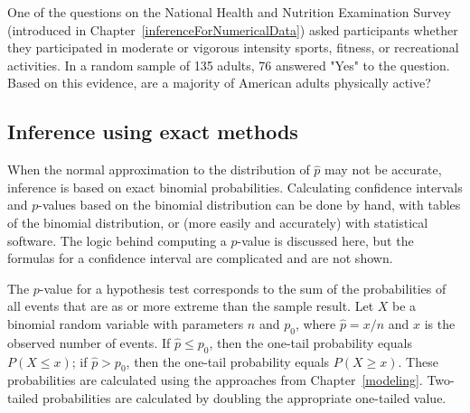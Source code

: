 
\textD{\newpage}

\begin{exercisewrap}
\begin{nexercise}
One of the questions on the National Health and Nutrition Examination Survey (introduced in Chapter~\ref{inferenceForNumericalData}) asked participants whether they participated in moderate or vigorous intensity sports, fitness, or recreational activities. In a random sample of 135 adults, 76 answered "Yes" to the question. Based on this evidence, are a majority of American adults physically active?\footnotemark{}
\end{nexercise}
\end{exercisewrap}


\subsection{Inference using exact methods}

When the normal approximation to the distribution of $\hat{p}$ may not be accurate, inference is based on exact binomial probabilities. Calculating confidence intervals and $p$-values based on the binomial distribution can be done by hand, with tables of the binomial distribution, or (more easily and accurately) with statistical software. The logic behind computing a $p$-value is discussed here, but the formulas for a confidence interval are complicated and are not shown.

The $p$-value for a hypothesis test corresponds to the sum of the probabilities of all events that are as or more extreme than the sample result. Let $X$ be a binomial random variable with parameters $n$ and $p_0$, where $\hat{p} = x/n$ and $x$ is the observed number of events. If $\hat{p} \leq p_0$, then the one-tail probability equals $P(X \leq x)$; if $\hat{p} > p_0$, then the one-tail probability equals $P(X \geq x)$. These probabilities are calculated using the approaches from Chapter~\ref{modeling}. Two-tailed probabilities are calculated by doubling the appropriate one-tailed value.

